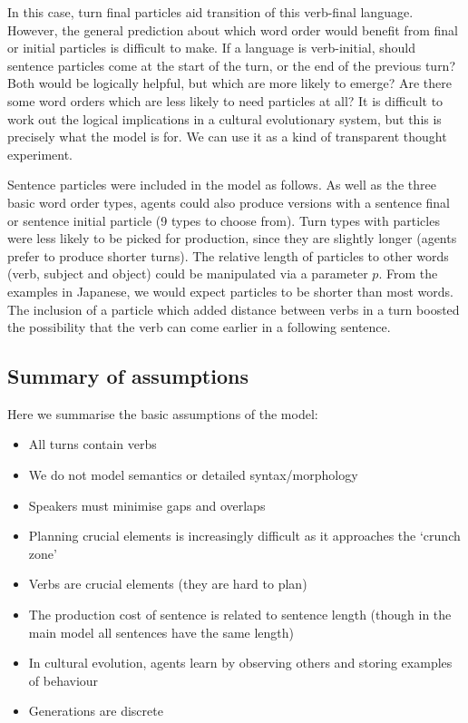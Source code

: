 \documentclass[12pt]{article}
\begin{document}
In this case, turn final particles aid transition of this verb-final language.  However, the general prediction about which word order would benefit from final or initial particles is difficult to make.  If a language is verb-initial, should sentence particles come at the start of the turn, or the end of the previous turn?  Both would be logically helpful, but which are more likely to emerge?  Are there some word orders which are less likely to need particles at all?  It is difficult to work out the logical implications in a cultural evolutionary system, but this is precisely what the model is for.  We can use it as a kind of transparent thought experiment.


Sentence particles were included in the model as follows.  As well as the three basic word order types, agents could also produce versions with a sentence final or sentence initial particle (9 types to choose from).  Turn types with particles were less likely to be picked for production, since they are slightly longer (agents prefer to produce shorter turns).  The relative length of particles to other words (verb, subject and object) could be manipulated via a parameter $p$.  From the examples in Japanese, we would expect particles to be shorter than most words.  The inclusion of a particle which added distance between verbs in a turn boosted the possibility that the verb can come earlier in a following sentence.  

\subsection{Summary of assumptions}

Here we summarise the basic assumptions of the model:

\begin{itemize}
\item All turns contain verbs
\item We do not model semantics or detailed syntax/morphology
\item Speakers must minimise gaps and overlaps
\item Planning crucial elements is increasingly difficult as it approaches the `crunch zone'
\item Verbs are crucial elements (they are hard to plan)
\item The production cost of sentence is related to sentence length 
(though in the main model all sentences have the same length)
\item  In cultural evolution, agents learn by observing others and storing examples of behaviour
\item Generations are discrete
\end{itemize}
\end{document}
